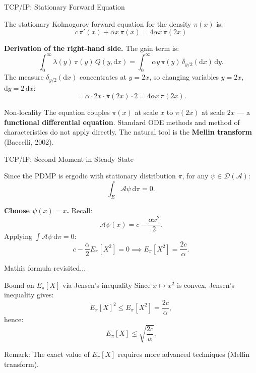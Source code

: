 \documentclass[aspectratio=169]{beamer}
\begin{document}
\begin{frame}{TCP/IP: Stationary Forward Equation}

  The stationary Kolmogorov forward equation for the density $\pi(x)$
  is:
  \[
    \boxed{
      c\,\pi'(x) + \alpha x\,\pi(x) = 4\alpha x\,\pi(2x)
    }
  \]

  \bigskip
  \textbf{Derivation of the right-hand side.} The gain term is:
  \[
    \int_0^\infty \lambda(y)\,\pi(y)\,Q(y,\mathrm{d}x)
    = \int_0^\infty \alpha y\,\pi(y)\,\delta_{y/2}(\mathrm{d}x)\,\mathrm{d}y.
  \]
  The measure $\delta_{y/2}(\mathrm{d}x)$ concentrates at $y = 2x$,
  so changing variables $y = 2x$, $\mathrm{d}y = 2\,\mathrm{d}x$:
  \[
    = \alpha \cdot 2x \cdot \pi(2x) \cdot 2 = 4\alpha x\,\pi(2x).
  \]

  \bigskip
  \begin{alertblock}{Non-locality}
    The equation couples $\pi(x)$ at scale $x$ to $\pi(2x)$ at scale
    $2x$ --- a \textbf{functional differential equation}. Standard
    ODE methods and method of characteristics do not apply directly.
    The natural tool is the \textbf{Mellin transform} (Baccelli, 2002).
  \end{alertblock}

\end{frame}

\begin{frame}{TCP/IP: Second Moment in Steady State}

  Since the PDMP is ergodic with stationary distribution $\pi$,
  for any $\psi \in \mathcal{D}(\mathcal{A})$:
  \[
    \int_E \mathcal{A}\psi\,\mathrm{d}\pi = 0.
  \]

  \bigskip
  \textbf{Choose $\psi(x) = x$.} Recall:
  \[
    \mathcal{A}\psi(x) = c - \frac{\alpha x^2}{2}.
  \]
  Applying $\int \mathcal{A}\psi\,\mathrm{d}\pi = 0$:
  \[
    c - \frac{\alpha}{2}E_\pi[X^2] = 0
    \implies
    \boxed{E_\pi[X^2] = \frac{2c}{\alpha}.}
  \]
\end{frame}

\begin{frame}{Mathis formula revisited...}

  \begin{block}{Bound on $E_\pi[X]$ via Jensen's inequality}
    Since $x \mapsto x^2$ is convex, Jensen's inequality gives:
    \[
      E_\pi[X]^2 \leq E_\pi[X^2] = \frac{2c}{\alpha},
    \]
    hence:
    \[
      E_\pi[X] \leq \sqrt{\frac{2c}{\alpha}}.
    \]
  \end{block}

  \vfill

  \alert{Remark:} The exact value of $E_\pi[X]$ requires more advanced techniques (Mellin transform).

\end{frame}
\end{document}
